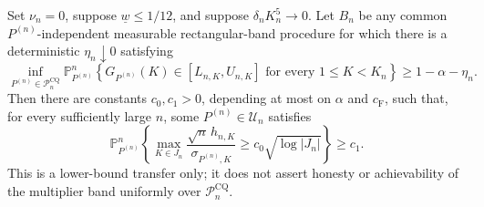Set \(\nu_n=0\), suppose \(\underline w\leq1/12\), and suppose \(\delta_nK_n^5\to0\).  Let \(B_n\) be any common \(P^{(n)}\)-independent measurable rectangular-band procedure for which there is a deterministic \(\eta_n\downarrow0\) satisfying
\[
 \inf_{P^{(n)}\in\mathcal P_n^{\mathrm{CQ}}}
 \mathbb P_{P^{(n)}}^n\!\left\{
 G_{P^{(n)}}(K)\in[L_{n,K},U_{n,K}]
 \text{ for every }1\leq K<K_n\right\}
 \geq1-\alpha-\eta_n.
\]
Then there are constants \(c_0,c_1>0\), depending at most on \(\alpha\) and \(c_{\mathrm F}\), such that, for every sufficiently large \(n\), some \(P^{(n)}\in\mathcal U_n\) satisfies
\[
 \mathbb P_{P^{(n)}}^n\!\left\{
 \max_{K\in J_n}\frac{\sqrt n\,h_{n,K}}{\sigma_{P^{(n)},K}}
 \geq c_0\sqrt{\log|J_n|}\right\}\geq c_1.
\]
This is a lower-bound transfer only; it does not assert honesty or achievability of the multiplier band uniformly over \(\mathcal P_n^{\mathrm{CQ}}\).